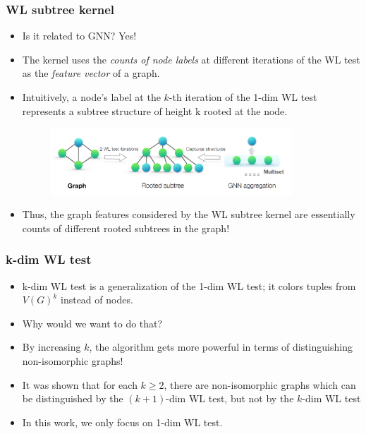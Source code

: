 \documentclass{beamer}
\begin{document}
\begin{frame}
\frametitle{WL subtree kernel}

\begin{itemize}
	\item Is it related to GNN? \pause Yes! \pause
	
	\item The kernel uses the {\it counts of node labels} at different iterations of the WL test as the {\it feature vector} of a graph. \pause
	
	\item Intuitively, a node’s label at the $k$-th iteration of the 1-dim WL test represents a subtree structure of height k rooted at the node.

	\begin{figure}[hbt]
		\includegraphics[height=2.5cm]{fig2.png}
	\end{figure}

	\item Thus, the graph features considered by the WL subtree kernel are essentially counts of different rooted subtrees in the graph!

\end{itemize}

\end{frame}

\begin{frame}
\frametitle{k-dim WL test}

\begin{itemize}
	\item k-dim WL test is a generalization of the 1-dim WL test; it colors tuples from $V(G)^k$ instead of nodes. \pause
	
	\item Why would we want to do that? \pause
	
	\item  By increasing $k$, the algorithm gets more powerful in terms of distinguishing non-isomorphic graphs!   \pause

	\item It was shown that for each $k \geq 2$, there are non-isomorphic graphs which can be distinguished by the $(k + 1)$-dim WL test, but not by the $k$-dim WL test \pause
	
	\item In this work, we only focus on 1-dim WL test.
\end{itemize}

\end{frame}
\end{document}
